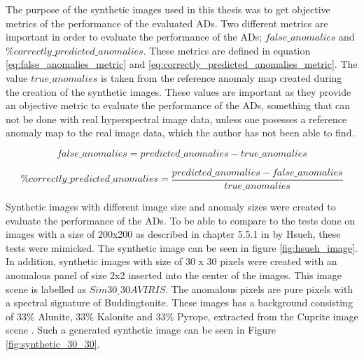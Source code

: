The purpose of the synthetic images used in this thesis was to get objective metrics of the performance of the evaluated ADs. Two different metrics are important in order to evaluate the performance of the ADs; $false\_anomalies$ and $\%correctly\_predicted\_anomalies$. These metrics are defined in equation \ref{eq:false_anomalies_metric} and \ref{eq:correctly_predicted_anomalies_metric}. The value $true\_anomalies$ is taken from the reference anomaly map created during the creation of the synthetic images. These values are important as they provide an objective metric to evaluate the performance of the ADs, something that can not be done with real hyperspectral image data, unless one posesses a reference anomaly map to the real image data, which the author has not been able to find.  

\begin{equation}
    false\_anomalies = predicted\_anomalies - true\_anomalies
    \label{eq:false_anomalies_metric}
\end{equation}


\begin{equation}
    \%correctly\_predicted\_anomalies= \frac{predicted\_anomalies-false\_anomalies}{true\_anomalies}
    \label{eq:correctly_predicted_anomalies_metric}
\end{equation}

Synthetic images with different image size and anomaly sizes were created to evaluate the performance of the ADs. To be able to compare to the tests done on images with a size of 200x200 as described in chapter 5.5.1 in \cite{hsueh_master_thesis} by Hsueh, these tests were mimicked. The synthetic image can be seen in figure \ref{fig:hsueh_image}. In addition, synthetic images with size of 30 x 30 pixels were created with an anomalous panel of size 2x2 inserted into the center of the images. This image scene is labelled as $Sim30\_30AVIRIS$. The anomalous pixels are pure pixels with a spectral signature of Buddingtonite. These images has a background consisting of $33\%$ Alunite, $33\%$ Kalonite and $33\%$ Pyrope, extracted from the Cuprite image scene \cite{ground_truth_cuprite}. Such a generated synthetic image can be seen in Figure \ref{fig:synthetic_30_30}.


